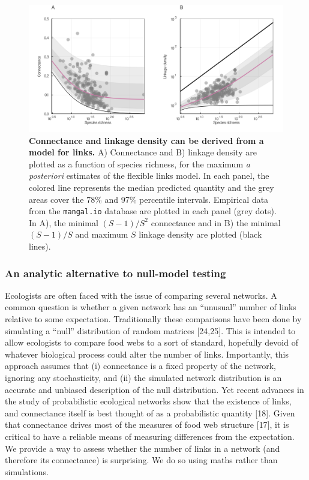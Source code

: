 \documentclass[12pt]{article}
\begin{document}
\begin{figure}
\hypertarget{fig:CoLd}{%
\centering
\includegraphics{figures/connectance_linkdens.png}
\caption{\textbf{Connectance and linkage density can be derived from a
model for links.} A) Connectance and B) linkage density are plotted as a
function of species richness, for the maximum \emph{a posteriori}
estimates of the flexible links model. In each panel, the colored line
represents the median predicted quantity and the grey areas cover the
78\% and 97\% percentile intervals. Empirical data from the
\texttt{mangal.io} database are plotted in each panel (grey dots). In
A), the minimal \((S-1)/S^2\) connectance and in B) the minimal
\((S-1)/S\) and maximum \(S\) linkage density are plotted (black
lines).}\label{fig:CoLd}
}
\end{figure}

\hypertarget{an-analytic-alternative-to-null-model-testing}{%
\subsubsection{An analytic alternative to null-model
testing}\label{an-analytic-alternative-to-null-model-testing}}

Ecologists are often faced with the issue of comparing several networks.
A common question is whether a given network has an ``unusual'' number
of links relative to some expectation. Traditionally these comparisons
have been done by simulating a ``null'' distribution of random matrices
{[}24,25{]}. This is intended to allow ecologists to compare food webs
to a sort of standard, hopefully devoid of whatever biological process
could alter the number of links. Importantly, this approach assumes that
(i) connectance is a fixed property of the network, ignoring any
stochasticity, and (ii) the simulated network distribution is an
accurate and unbiased description of the null distribution. Yet recent
advances in the study of probabilistic ecological networks show that the
existence of links, and connectance itself is best thought of as a
probabilistic quantity {[}18{]}. Given that connectance drives most of
the measures of food web structure {[}17{]}, it is critical to have a
reliable means of measuring differences from the expectation. We provide
a way to assess whether the number of links in a network (and therefore
its connectance) is surprising. We do so using maths rather than
simulations.
\end{document}

